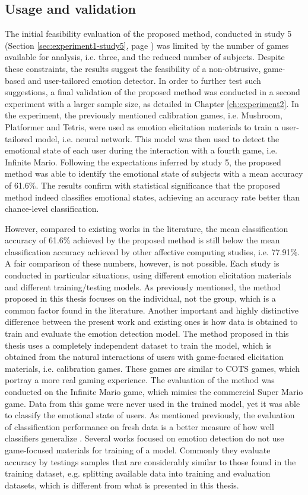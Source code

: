\subsection{Usage and validation}

The initial feasibility evaluation of the proposed method, conducted in study 5 (Section \ref{sec:experiment1-study5}, page \pageref{sec:experiment1-study5}) was limited by the number of games available for analysis, i.e. three, and the reduced number of subjects. Despite these constraints, the results suggest the feasibility of a non-obtrusive, game-based and user-tailored emotion detector. In order to further test such suggestions, a final validation of the proposed method was conducted in a second experiment with a larger sample size, as detailed in Chapter \ref{ch:experiment2}. In the experiment, the previously mentioned calibration games, i.e. Mushroom, Platformer and Tetris, were used as emotion elicitation materials to train a user-tailored model, i.e. neural network. This model was then used to detect the emotional state of each user during the interaction with a fourth game, i.e. Infinite Mario. Following the expectations inferred by study 5, the proposed method was able to identify the emotional state of subjects with a mean accuracy of 61.6\%. The results confirm with statistical significance that the proposed method indeed classifies emotional states, achieving an accuracy rate better than chance-level classification.

However, compared to existing works in the literature, the mean classification accuracy of 61.6\% achieved by the proposed method is still below the mean classification accuracy achieved by other affective computing studies, i.e. 77.91\%. A fair comparison of these numbers, however, is not possible. Each study is conducted in particular situations, using different emotion elicitation materials and different training/testing models. As previously mentioned, the method proposed in this thesis focuses on the individual, not the group, which is a common factor found in the literature. Another important and highly distinctive difference between the present work and existing ones is how data is obtained to train and evaluate the emotion detection model. The method proposed in this thesis uses a completely independent dataset to train the model, which is obtained from the natural interactions of users with game-focused elicitation materials, i.e. calibration games. These games are similar to COTS games, which portray a more real gaming experience. The evaluation of the method was conducted on the Infinite Mario game, which mimics the commercial Super Mario game. Data from this game were never used in the trained model, yet it was able to classify the emotional state of users. As mentioned previously, the evaluation of classification performance on fresh data is a better measure of how well classifiers generalize \parencite[Chapter 5]{james2013introduction}. Several works focused on emotion detection do not use game-focused materials for training of a model. Commonly they evaluate accuracy by testings samples that are considerably similar to those found in the training dataset, e.g. splitting available data into training and evaluation datasets, which is different from what is presented in this thesis.

